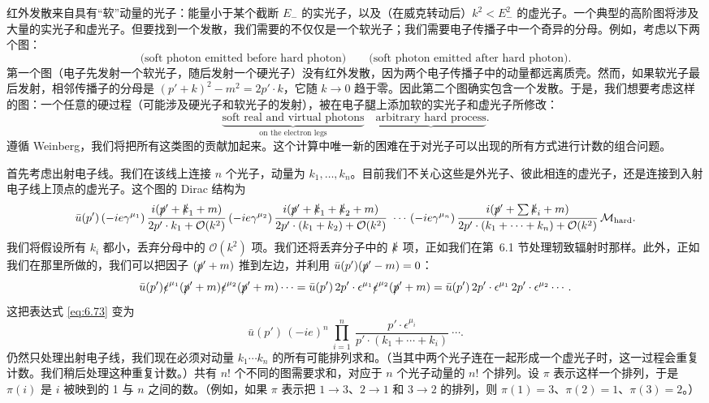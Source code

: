红外发散来自具有``软''动量的光子：能量小于某个截断 $E_{-}$ 的实光子，以及（在威克转动后）$k^2 < E_{-}^2$ 的虚光子。一个典型的高阶图将涉及大量的实光子和虚光子。但要找到一个发散，我们需要的不仅仅是一个软光子；我们需要电子传播子中一个奇异的分母。例如，考虑以下两个图：
\begin{equation}
  \text{(soft photon emitted before hard photon)} \qquad
  \text{(soft photon emitted after hard photon)} .
\end{equation}
第一个图（电子先发射一个软光子，随后发射一个硬光子）没有红外发散，因为两个电子传播子中的动量都远离质壳。然而，如果软光子最后发射，相邻传播子的分母是 $(p'+k)^2 - m^2 = 2p'\cdot k$，它随 $k\to 0$ 趋于零。因此第二个图确实包含一个发散。于是，我们想要考虑这样的图：一个任意的硬过程（可能涉及硬光子和软光子的发射），被在电子腿上添加软的实光子和虚光子所修改：
\begin{equation}
  \underbrace{\text{soft real and virtual photons}}_{\text{on the electron
    legs}}\quad \underbrace{\text{arbitrary hard process}} .
\end{equation}
遵循 Weinberg，我们将把所有这类图的贡献加起来。这个计算中唯一新的困难在于对光子可以出现的所有方式进行计数的组合问题。

首先考虑出射电子线。我们在该线上连接 $n$ 个光子，动量为 $k_1, \ldots, k_n$。目前我们不关心这些是外光子、彼此相连的虚光子，还是连接到入射电子线上顶点的虚光子。这个图的 Dirac 结构为
\begin{equation}
  \bar{u}(p')\,(-ie\gamma^{\mu_1})\,
  \frac{i(\slashed{p}'+\slashed{k}_1+m)}{2p'\cdot k_1 + \mathcal{O}(k^2)}\,
  (-ie\gamma^{\mu_2})\,
  \frac{i(\slashed{p}'+\slashed{k}_1+\slashed{k}_2+m)}
    {2p'\cdot(k_1+k_2) + \mathcal{O}(k^2)}\ \cdots\,
  (-ie\gamma^{\mu_n})\,
  \frac{i(\slashed{p}'+\textstyle\sum\slashed{k}_i+m)}
    {2p'\cdot(k_1+\cdots+k_n) + \mathcal{O}(k^2)}\,
  \mathcal{M}_{\mathrm{hard}} .
  \label{eq:6.73}
\end{equation}
我们将假设所有 $k_i$ 都小，丢弃分母中的 $\mathcal{O}(k^2)$ 项。我们还将丢弃分子中的 $\slashed{k}$ 项，正如我们在第~6.1 节处理轫致辐射时那样。此外，正如我们在那里所做的，我们可以把因子 $(\slashed{p}'+m)$ 推到左边，并利用 $\bar{u}(p')(\slashed{p}'-m) = 0$：
\begin{equation}
  \bar{u}(p')\slashed{\epsilon}^{\mu_1}(\slashed{p}'+m)
    \slashed{\epsilon}^{\mu_2}(\slashed{p}'+m)\cdots
  = \bar{u}(p')\,2p'\cdot\epsilon^{\mu_1}\slashed{\epsilon}^{\mu_2}
    (\slashed{p}'+m) = \bar{u}(p')\,2p'\cdot\epsilon^{\mu_1}\,
    2p'\cdot\epsilon^{\mu_2}\cdots .
\end{equation}
这把表达式 \eqref{eq:6.73} 变为
\begin{equation}
  \bar{u}(p')\,(-ie)^n\ \prod_{i=1}^{n}\ \frac{p'\cdot\epsilon^{\mu_i}}
    {p'\cdot(k_1+\cdots+k_i)}\ \cdots .
  \label{eq:6.74}
\end{equation}
仍然只处理出射电子线，我们现在必须对动量 $k_1\cdots k_n$ 的所有可能排列求和。（当其中两个光子连在一起形成一个虚光子时，这一过程会重复计数。我们稍后处理这种重复计数。）共有 $n!$ 个不同的图需要求和，对应于 $n$ 个光子动量的 $n!$ 个排列。设 $\pi$ 表示这样一个排列，于是 $\pi(i)$ 是 $i$ 被映到的 1 与 $n$ 之间的数。（例如，如果 $\pi$ 表示把 $1\to 3$、$2\to 1$ 和 $3\to 2$ 的排列，则 $\pi(1) = 3$、$\pi(2) = 1$、$\pi(3) = 2$。）

